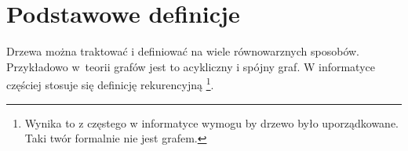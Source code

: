


\section{Podstawowe definicje}

Drzewa można traktować i definiować na wiele równowarznych sposobów.
Przykładowo w~teorii grafów jest to acykliczny i spójny graf.
W informatyce częściej stosuje się definicję rekurencyjną
\footnote{
    Wynika to z częstego w informatyce wymogu by drzewo było uporządkowane.
    Taki twór formalnie nie jest grafem.
}.

